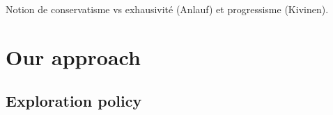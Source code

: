 \documentclass[preprint,12pt,authoryear]{elsarticle}
\begin{document}



{\color{green} Notion de conservatisme vs exhausivité (Anlauf) et progressisme (Kivinen).}












\section{Our approach}

\subsection{Exploration policy}
\end{document}
